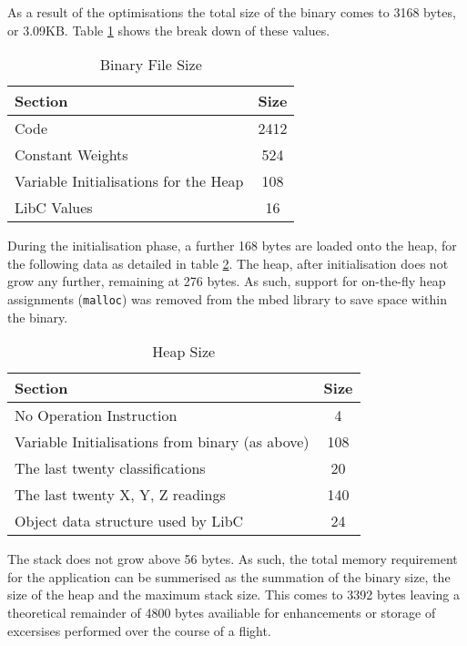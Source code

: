 As a result of the optimisations the total size of the binary comes to 3168 bytes, or 3.09KB. Table \ref{tab:prog-size} shows the break down of these values.

\begin{table}[h]
    \centering
    \begin{tabular}{|l|c|}
        \hline
        Section & Size \\
        \hline
        Code & 2412 \\
        Constant Weights & 524 \\
        Variable Initialisations for the Heap & 108 \\
        LibC Values & 16 \\
        \hline
    \end{tabular}
    \caption{Binary File Size \label{tab:prog-size}}
\end{table}

During the initialisation phase, a further 168 bytes are loaded onto the heap, for the following data as detailed in table \ref{tab:heap-size}. The heap, after initialisation does not grow any further, remaining at 276 bytes. As such, support for on-the-fly heap assignments (\verb|malloc|) was removed from the mbed library to save space within the binary.

\begin{table}[h]
    \centering
    \begin{tabular}{|l|c|}
        \hline
        Section & Size \\
        \hline
        No Operation Instruction & 4 \\
        Variable Initialisations from binary (as above) & 108 \\
        The last twenty classifications & 20 \\
        The last twenty X, Y, Z readings & 140 \\
        Object data structure used by LibC & 24 \\
        \hline
    \end{tabular}
    \caption{Heap Size \label{tab:heap-size}}
\end{table}

The stack does not grow above 56 bytes. As such, the total memory requirement for the application can be summerised as the summation of the binary size, the size of the heap and the maximum stack size. This comes to 3392 bytes leaving a theoretical remainder of 4800 bytes availiable for enhancements or storage of excersises performed over the course of a flight.
